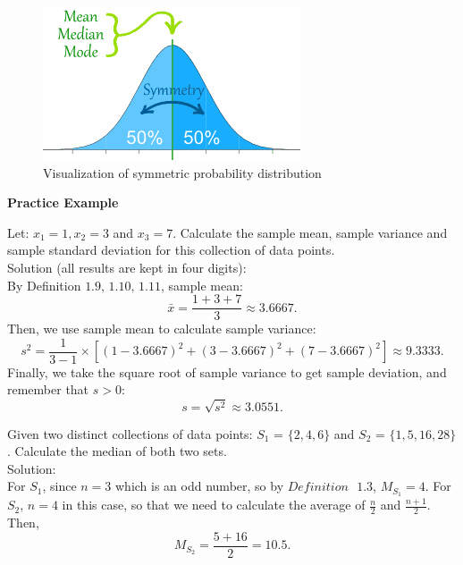 \begin{figure}[H]
 \centering
 \includegraphics[scale=0.75]{Section1/img/Symmetry.jpg}
 \caption{Visualization of symmetric probability distribution}
\end{figure}

\textbf{Practice Example}

\begin{example}
Let: $x_1 = 1, x_2 = 3$ and $x_3 = 7$. Calculate the sample mean, sample variance and sample standard deviation for this collection of data points.\\
Solution (all results are kept in four digits):\\
By Definition $1.9 \text{, } 1.10 \text{, } 1.11$, sample mean: \[ \bar{x} = \frac{1+3+7}{3} \approx 3.6667.\]
Then, we use sample mean to calculate sample variance: \[ s^2 = \frac{1}{3-1} \times [(1-3.6667)^2+(3-3.6667)^2+(7-3.6667)^2] \approx 9.3333.\]
Finally, we take the square root of sample variance to get sample deviation, and remember that $s > 0$: \[ s = \sqrt{s^2} \approx 3.0551.\]
\end{example}

\begin{example}
Given two distinct collections of data points: $S_1$ = $\{2, 4, 6\}$ and $S_2$ = $\{1, 5, 16, 28\}$. Calculate the median of both two sets.\\
Solution: \\
For $S_1$, since $n = 3$ which is an odd number, so by $Definition \text{ } 1.3$, $M_{S_1} = 4$. For $S_2$, $n = 4$ in this case, so that we need to calculate the average of $\frac{n}{2}$ and $\frac{n+1}{2}$. Then, \[ M_{S_2} = \frac{5+16}{2} = 10.5.\]
\end{example}


